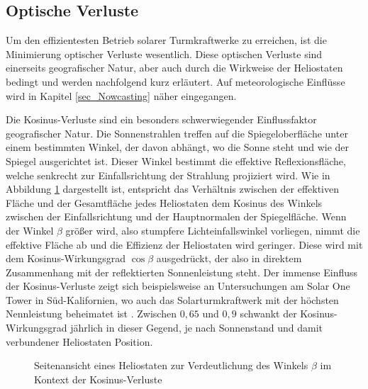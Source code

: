 \subsection{Optische Verluste} \label{subsec_OptischeVerluste}
Um den effizientesten Betrieb solarer Turmkraftwerke zu erreichen, ist die Minimierung optischer Verluste wesentlich.
Diese optischen Verluste sind einerseits geografischer Natur, aber auch durch die Wirkweise der Heliostaten bedingt und werden nachfolgend kurz erläutert.
Auf meteorologische Einflüsse wird in Kapitel \ref{sec_Nowcasting} näher eingegangen.

Die Kosinus-Verluste sind ein besonders schwerwiegender Einflussfaktor geografischer Natur.
Die Sonnenstrahlen treffen auf die Spiegeloberfläche unter einem bestimmten Winkel, der davon abhängt, wo die Sonne steht und wie der Spiegel ausgerichtet ist.
Dieser Winkel bestimmt die effektive Reflexionsfläche, welche senkrecht zur Einfallsrichtung der Strahlung projiziert wird.
Wie in Abbildung \ref{fig_KosinusVerlust} dargestellt ist, entspricht das Verhältnis zwischen der effektiven Fläche und der Gesamtfläche jedes Heliostaten dem Kosinus des Winkels zwischen der Einfallsrichtung und der Hauptnormalen der Spiegelfläche.
Wenn der Winkel $\beta$ größer wird, also stumpfere Lichteinfallswinkel vorliegen, nimmt die effektive Fläche ab und die Effizienz der Heliostaten wird geringer.
Diese wird mit dem Kosinus-Wirkungsgrad $\cos\beta$ ausgedrückt, der also in direktem Zusammenhang mit der reflektierten Sonnenleistung steht.
Der immense Einfluss der Kosinus-Verluste zeigt sich beispielsweise an Untersuchungen am Solar One Tower in Süd-Kalifornien, wo auch das Solarturmkraftwerk mit der höchsten Nennleistung beheimatet ist \cite{Ivanpah}.
Zwischen $0,65$ und $0,9$ schwankt der Kosinus-Wirkungsgrad jährlich in dieser Gegend, je nach Sonnenstand und damit verbundener Heliostaten Position. \cite{Holl}

\begin{figure}[h!]
    \centering
    \setlength{\fboxsep}{1pt}
    \setlength{\fboxrule}{1pt}
\caption[Seitenansicht eines Heliostaten zur Verdeutlichung des Winkels $\beta$ im Kontext der Kosinus-Verluste]{Seitenansicht eines Heliostaten zur Verdeutlichung des Winkels $\beta$ im Kontext der Kosinus-Verluste \cite[S. 7]{DissZanger}}
    \label{fig_KosinusVerlust}
\end{figure}

